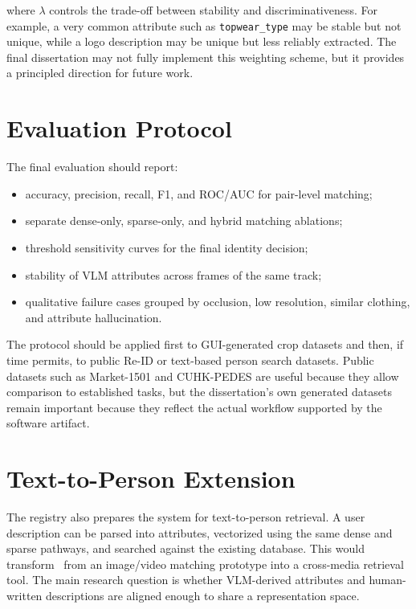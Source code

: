 \noindent where $\lambda$ controls the trade-off between stability and discriminativeness. For example, a very common attribute such as \texttt{topwear\_type} may be stable but not unique, while a logo description may be unique but less reliably extracted. The final dissertation may not fully implement this weighting scheme, but it provides a principled direction for future work.

\section{Evaluation Protocol}

The final evaluation should report:

\begin{itemize}
  \item accuracy, precision, recall, F1, and ROC/AUC for pair-level matching;
  \item separate dense-only, sparse-only, and hybrid matching ablations;
  \item threshold sensitivity curves for the final identity decision;
  \item stability of VLM attributes across frames of the same track;
  \item qualitative failure cases grouped by occlusion, low resolution, similar clothing, and attribute hallucination.
\end{itemize}

The protocol should be applied first to GUI-generated crop datasets and then, if time permits, to public Re-ID or text-based person search datasets. Public datasets such as Market-1501 and CUHK-PEDES are useful because they allow comparison to established tasks, but the dissertation's own generated datasets remain important because they reflect the actual workflow supported by the software artifact.

\section{Text-to-Person Extension}

The registry also prepares the system for text-to-person retrieval. A user description can be parsed into attributes, vectorized using the same dense and sparse pathways, and searched against the existing database. This would transform \systemname\ from an image/video matching prototype into a cross-media retrieval tool. The main research question is whether VLM-derived attributes and human-written descriptions are aligned enough to share a representation space.

